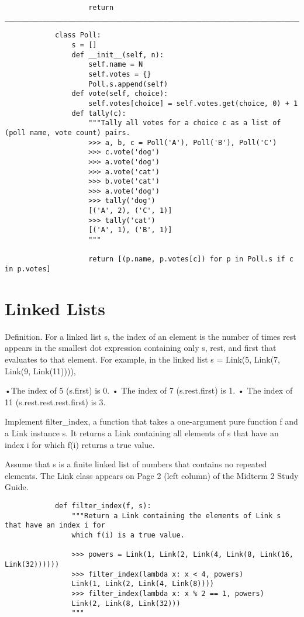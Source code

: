 \documentclass{exam}
\begin{document}
\begin{questions}
\begin{blocksection}
\begin{blocksection}
\begin{lstlisting}
					return _____________________________________________________________________________________		
		\end{lstlisting}
	\end{blocksection}
	\begin{solution}
		\begin{lstlisting}
			class Poll:
				s = []
				def __init__(self, n):
					self.name = N
					self.votes = {}
					Poll.s.append(self)
				def vote(self, choice):
					self.votes[choice] = self.votes.get(choice, 0) + 1
				def tally(c):
					"""Tally all votes for a choice c as a list of (poll name, vote count) pairs.
					>>> a, b, c = Poll('A'), Poll('B'), Poll('C')
					>>> c.vote('dog')
					>>> a.vote('dog')
					>>> a.vote('cat')
					>>> b.vote('cat')
					>>> a.vote('dog')
					>>> tally('dog')
					[('A', 2), ('C', 1)]
					>>> tally('cat')
					[('A', 1), ('B', 1)]
					"""
					
					return [(p.name, p.votes[c]) for p in Poll.s if c in p.votes]
		\end{lstlisting}
	\end{solution}
\section{Linked Lists}
	\begin{blocksection}
		Definition. For a linked list s, the index of an element is the number of times rest appears in the smallest
		dot expression containing only s, rest, and first that evaluates to that element. For example, in the
		linked list s = Link(5, Link(7, Link(9, Link(11)))),
		
		•The index of 5 (s.first) is 0.
		• The index of 7 (s.rest.first) is 1.
		• The index of 11 (s.rest.rest.rest.first) is 3.
		
		Implement filter_index, a function that takes a one-argument pure function f and a Link instance s. It
		returns a Link containing all elements of s that have an index i for which f(i) returns a true value.
		
		Assume that s is a finite linked list of numbers that contains no repeated elements. The Link class appears
		on Page 2 (left column) of the Midterm 2 Study Guide.
		\begin{lstlisting}
			def filter_index(f, s):
				"""Return a Link containing the elements of Link s that have an index i for
				which f(i) is a true value.
				
				>>> powers = Link(1, Link(2, Link(4, Link(8, Link(16, Link(32))))))
				>>> filter_index(lambda x: x < 4, powers)
				Link(1, Link(2, Link(4, Link(8))))
				>>> filter_index(lambda x: x % 2 == 1, powers)
				Link(2, Link(8, Link(32)))
				"""
				

\end{lstlisting}
\end{blocksection}
\end{blocksection}
\end{questions}
\end{document}
